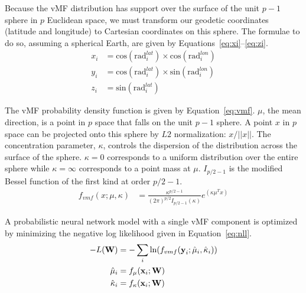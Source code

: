 \documentclass[11pt,a4paper]{article}
\begin{document}
Because the vMF distribution has support over the surface of the unit $p-1$ sphere in $p$ Euclidean space, we must transform our geodetic coordinates (latitude and longitude) to Cartesian coordinates on this sphere. The formulae to do so, assuming a spherical Earth, are given by Equations~\ref{eq:xi}--\ref{eq:zi}.
\begin{align}
    x_i &= \text{cos} ( \text{rad}^{lat}_i ) \times \text{cos} ( \text{rad}^{lon}_i ) \label{eq:xi} \\ 
    y_i &= \text{cos} ( \text{rad}^{lat}_i ) \times \text{sin} ( \text{rad}^{lon}_i ) \label{eq:yi}\\
    z_i &= \text{sin} ( \text{rad}^{lat}_i ) \label{eq:zi}
\end{align}

The vMF probability density function is given by Equation~\ref{eq:vmf}. $\mu$, the mean direction, is a point in $p$ space that falls on the unit $p-1$ sphere. A point $x$ in $p$ space can be projected onto this sphere by $L2$ normalization: $x/||x||$. The concentration parameter, $\kappa$, controls the dispersion of the distribution across the surface of the sphere. $\kappa=0$ corresponds to a uniform distribution over the entire sphere while $\kappa=\infty$ corresponds to a point mass at $\mu$. $I_{p/2-1}$ is the modified Bessel function of the first kind at order $p/2-1$.
\begin{align}\label{eq:vmf}
    f_{vmf}(x;\mu,\kappa) &=  \frac{\kappa^{p/2-1}}{(2\pi)^{p/2}I_{p/2-1}(\kappa)}e^{(\kappa \mu^T x)}
\end{align}

A probabilistic neural network model with a single vMF component is optimized by minimizing the negative log likelihood given in Equation~\ref{eq:nll}.
\begin{align}\label{eq:nll}
    -L(\textbf{W}) &= -\sum_{i} \text{ln}(f_{vmf}(\textbf{y}_i;\hat{\mu}_i,\hat{\kappa}_i)) \\ \notag
    \hat{\mu}_i &= f_{\mu}(\textbf{x}_i; \textbf{W}) \\ \notag
    \hat{\kappa}_i &= f_{\kappa}(\textbf{x}_i; \textbf{W})
\end{align}
\end{document}
